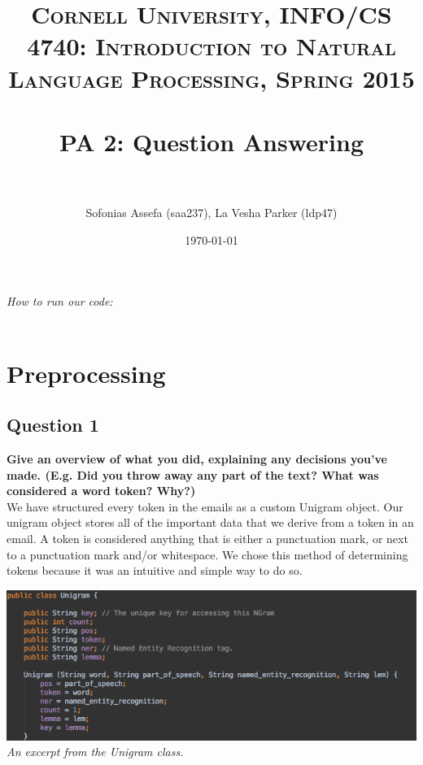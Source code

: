\documentclass{article} %
\title{	
\normalfont \normalsize 
\textsc{Cornell University, INFO/CS 4740: Introduction to Natural Language Processing, Spring 2015} \\
\horrule{0.5pt} \\[0.4cm] %
\huge PA 2: Question Answering \\ %
\horrule{2pt} \\[0.5cm] %
}
\author{Sofonias Assefa (saa237), La Vesha Parker (ldp47)}
\date{\normalsize\today} %
\begin{document}
\maketitle %

\textit{How to run our code:\\
}\\

\section{Preprocessing}
\subsection*{Question 1}

\textbf{Give an overview of what you did, explaining any decisions you've made. (E.g. Did you throw away any part of the text? What was considered a word token? Why?)}
\\

We have structured every token in the emails as a custom Unigram object. Our unigram object stores all of the important data that we derive from a token in an email. A token is considered anything that is either a punctuation mark, or next to a punctuation mark and/or whitespace. We chose this method of determining tokens because it was an intuitive and simple way to do so.\\
\begin{center}
\includegraphics[width=1.0\textwidth]{images/unigram.png}
\textit{An excerpt from the Unigram class.}
\end{center}
\end{document}
